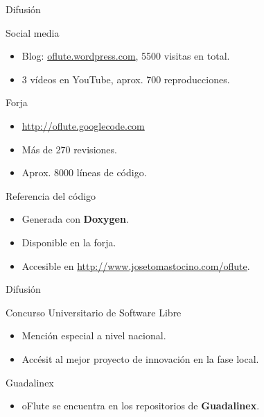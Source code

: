 \begin{frame}{Difusión}
  \begin{block}{Social media}
    \begin{itemize}
    \item Blog: \url{oflute.wordpress.com}, 5500 visitas en total.
    \item 3 vídeos en YouTube, aprox. 700 reproducciones.
    \end{itemize}    
  \end{block}

  \pause

  \begin{block}{Forja}
    \begin{itemize}
    \item \url{http://oflute.googlecode.com}
    \item Más de 270 revisiones.
    \item Aprox. 8000 líneas de código.
    \end{itemize}
  \end{block}

  \pause

  \begin{block}{Referencia del código}
    \begin{itemize}
    \item Generada con \textbf{Doxygen}.
    \item Disponible en la forja.
    \item Accesible en \url{http://www.josetomastocino.com/oflute}.
    \end{itemize}
  \end{block}
\end{frame}

\begin{frame}{Difusión}
  \begin{block}{Concurso Universitario de Software Libre}
    \begin{itemize}
    \item Mención especial a nivel nacional.
    \item Accésit al mejor proyecto de innovación en la fase local.
    \end{itemize}
  \end{block}
  
  \pause

  \begin{block}{Guadalinex}
    \begin{itemize}
    \item oFlute se encuentra  en los repositorios de \textbf{Guadalinex}.
    \end{itemize}
  \end{block}
\end{frame}
